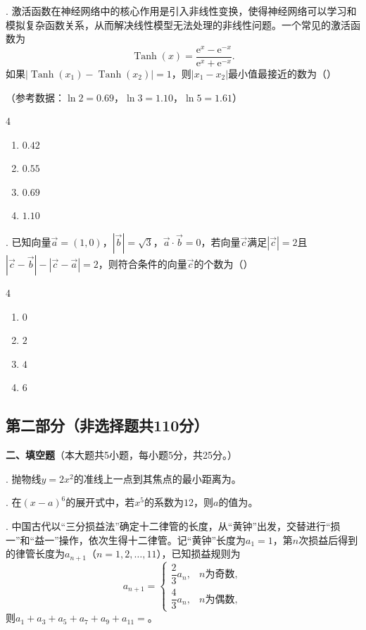 . 激活函数在神经网络中的核心作用是引入非线性变换，使得神经网络可以学习和模拟复杂函数关系，从而解决线性模型无法处理的非线性问题。一个常见的激活函数为
\[
\operatorname{Tanh}(x)=\frac{\mathrm{e}^x-\mathrm{e}^{-x}}{\mathrm{e}^x+\mathrm{e}^{-x}}.
\]
如果$|\operatorname{Tanh}(x_1)-\operatorname{Tanh}(x_2)|=1$，则$|x_1-x_2|$最小值最接近的数为（\quad）

\noindent（参考数据：$\ln2=0.69$，$\ln3=1.10$，$\ln5=1.61$）
\begin{multicols}{4}
\begin{enumerate}[label=\Alph*.,leftmargin=*]
  \item $0.42$
  \item $0.55$
  \item $0.69$
  \item $1.10$
\end{enumerate}
\end{multicols}

. 已知向量$\vec a=(1,0)$，$|\vec b|=\sqrt3$，$\vec a\cdot\vec b=0$，若向量$\vec c$满足$|\vec c|=2$且$|\vec c-\vec b|-|\vec c-\vec a|=2$，则符合条件的向量$\vec c$的个数为（\quad）
\begin{multicols}{4}
\begin{enumerate}[label=\Alph*.,leftmargin=*]
  \item $0$
  \item $2$
  \item $4$
  \item $6$
\end{enumerate}
\end{multicols}

\subsection*{第二部分（非选择题\quad 共110分）}

\noindent\textbf{二、填空题}（本大题共5小题，每小题5分，共25分。）

. 抛物线$y=2x^2$的准线上一点到其焦点的最小距离为\underline{\hspace{3cm}}。

. 在$(x-a)^6$的展开式中，若$x^5$的系数为$12$，则$a$的值为\underline{\hspace{3cm}}。

. 中国古代以“三分损益法”确定十二律管的长度，从“黄钟”出发，交替进行“损一”和“益一”操作，依次生得十二律管。记“黄钟”长度为$a_1=1$，第$n$次损益后得到的律管长度为$a_{n+1}$（$n=1,2,\ldots,11$），已知损益规则为
\[
a_{n+1}=\begin{cases}
\dfrac23a_n,&n\text{为奇数},\\[4pt]
\dfrac43a_n,&n\text{为偶数},
\end{cases}
\]
则$a_1+a_3+a_5+a_7+a_9+a_{11}=$\underline{\hspace{3cm}}。

